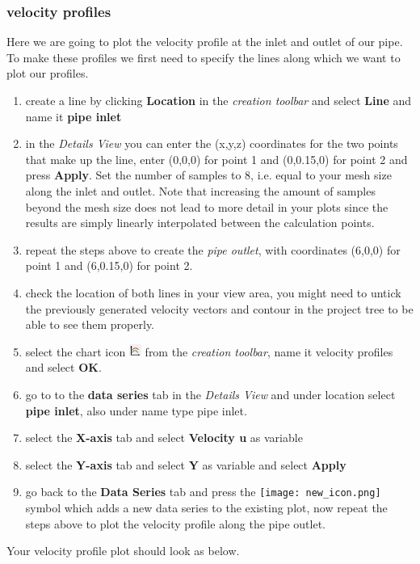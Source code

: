 \documentclass[11pt,a4paper,oneside]{scrartcl}
\newcommand\bfr[1]{\textcolor[rgb]{1,0.00,0.00}{\textbf{\textsf{#1}}}}
\begin{document}
\subsubsection{velocity profiles}
Here we are going to plot the velocity profile at the inlet and outlet of our pipe. To make these profiles we first need to specify the lines along which we want to plot our profiles.
\begin{enumerate}
\item create a line by clicking \bfr{Location} in the \emph{creation toolbar} and select \bfr{Line} and name it \bfr{pipe inlet}
\item in the \emph{Details View} you can enter the (x,y,z) coordinates for the two points that make up the line, enter (0,0,0) for point 1 and (0,0.15,0) for point 2 and press \bfr{Apply}. Set the number of samples to 8, i.e. equal to your mesh size along the inlet and outlet. Note that increasing the amount of samples beyond the mesh size does not lead to more detail in your plots since the results are simply linearly interpolated between the calculation points.
\item repeat the steps above to create the \emph{pipe outlet}, with coordinates (6,0,0) for point 1 and (6,0.15,0) for point 2.
\item check the location of both lines in your view area, you might need to untick the previously generated velocity vectors and contour in the project tree to be able to see them properly.
\item select the chart icon \includegraphics[width=0.4cm]{chart_icon.png} from the \emph{creation toolbar}, name it velocity profiles and select \bfr{OK}.
\item go to to the \bfr{data series} tab in the \emph{Details View} and under location select \bfr{pipe inlet}, also under name type pipe inlet.
\item select the \bfr{X-axis} tab and select \bfr{Velocity u} as variable
\item select the \bfr{Y-axis} tab and select \bfr{Y} as variable and select \bfr{Apply}
\item go back to the \bfr{Data Series} tab and press the \texttt{[image: new\_icon.png]} symbol which adds a new data series to the existing plot, now repeat the steps above to plot the velocity profile along the pipe outlet.
\end{enumerate}
Your velocity profile plot should look as below.
\end{document}
